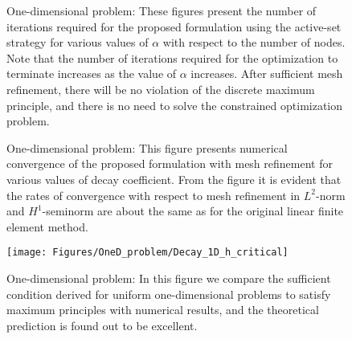 \documentclass[11pt]{amsart}
\begin{document}
\begin{figure}[h]
  \centering
\caption{One-dimensional problem: These figures present the number of iterations required 
      for the proposed formulation using the active-set strategy for various values of $\alpha$ 
      with respect to the number of nodes. Note that the number of iterations required for the 
      optimization to terminate increases as the value of $\alpha$ increases. After sufficient 
      mesh refinement, there will be no violation of the discrete maximum principle, and there 
      is no need to solve the constrained optimization problem.}
    \label{Fig:Decay_1D_active_set_iterations}
\end{figure}

\begin{figure}[h]
  \centering
\caption{One-dimensional problem: This figure presents numerical 
  convergence of the proposed formulation with mesh refinement for 
  various values of decay coefficient. From the figure it is evident 
  that the rates of convergence with respect to mesh refinement in 
  $L^{2}$-norm and $H^{1}$-seminorm are about the same as for the original 
  linear finite element method.} \label{Fig:Decay_error_convergence_1D}
  \end{figure}
  
\begin{figure}[h]
  \centering
  \texttt{[image: Figures/OneD\_problem/Decay\_1D\_h\_critical]}
  \caption{One-dimensional problem: In this figure we compare the sufficient condition 
  derived for uniform one-dimensional problems to satisfy maximum principles with 
  numerical results, and the theoretical prediction is found out to be excellent.} 
  \label{Fig:Decay_1D_h_critical}
\end{figure}
\end{document}
